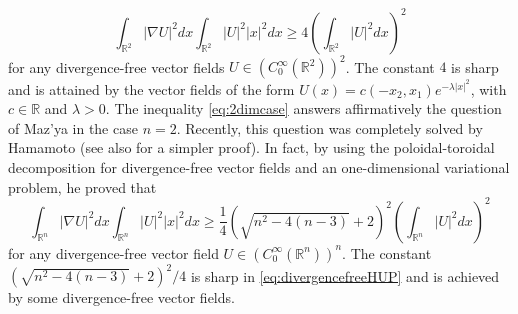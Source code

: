 \documentclass[a4paper,12pt]{article}
\theoremstyle{plain}
\theoremstyle{definition}
\theoremstyle{remark}
\def\R{\mathbb R}%
\def\lt{\left}%
\def\rt{\right}%
\numberwithin{equation}{section}
\begin{document}
\begin{equation}\label{eq:2dimcase}
\int_{\R^2} |\nabla U|^2 dx \int_{\R^2} |U|^2 |x|^2 dx \geq 4 \lt(\int_{\R^2} |U|^2 dx\rt)^2
\end{equation}
for any divergence-free vector fields $U\in (C^\infty_0(\R^2))^2$. The constant $4$ is sharp and is attained by the vector fields of the form $U(x) =c(-x_2,x_1) e^{-\lambda |x|^2}$, with $c\in \R$ and $\lambda >0$. The inequality \eqref{eq:2dimcase} answers affirmatively the question of Maz'ya in the case $n=2$. Recently, this question was completely solved by Hamamoto \cite{HamaMaz} (see also \cite{Hamasimple} for a simpler proof). In fact, by using the poloidal-toroidal decomposition for divergence-free vector fields and an one-dimensional variational problem, he proved that
\begin{equation}\label{eq:divergencefreeHUP}
\int_{\R^n} |\nabla U|^2 dx \int_{\R^n} |U|^2 |x|^2 dx \geq \frac14(\sqrt{n^2-4(n-3)} +2)^2 \lt(\int_{\R^n} |U|^2 dx\rt)^2
\end{equation}
for any divergence-free vector field $U\in (C_0^\infty(\R^n))^n$. The constant $(\sqrt{n^2-4(n-3)} +2)^2/4$ is sharp in \eqref{eq:divergencefreeHUP} and is achieved by some divergence-free vector fields.
\end{document}
